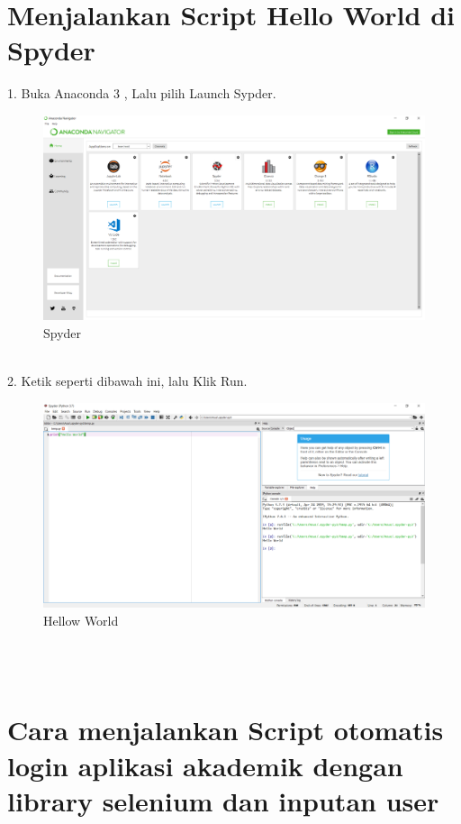 \documentclass[12pt, times new roman, a4paper]{article}
\begin{document}
\section{Menjalankan Script Hello World di Spyder}
1. Buka Anaconda 3 , Lalu pilih Launch Sypder.\\
\begin{figure}[h]
	\centering
		\includegraphics[scale=0.2]{Gambar/S1}
		\caption{Spyder}
\end{figure}
\\
2. Ketik seperti dibawah ini, lalu Klik Run.\\
\begin{figure}[h]
	\centering
		\includegraphics[scale=0.2]{Gambar/S2}
	\caption{Hellow World}
\end{figure}
\\
\\
\section{Cara menjalankan Script otomatis login aplikasi akademik dengan library selenium dan inputan user}
\end{document}
